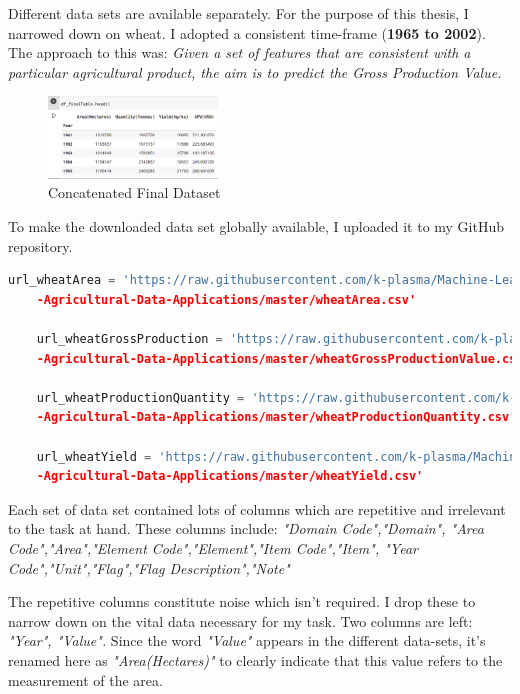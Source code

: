Different data sets are available separately. For the purpose of this thesis, I narrowed down on wheat. I adopted a consistent time-frame (\textbf{1965 to 2002}). The approach to this was: \textit{Given a set of features that are consistent with a particular agricultural product, the aim is to predict the Gross Production Value.}


\begin{figure}[h!]
	\centering
	\includegraphics[width=0.4\textwidth,height=\textheight,keepaspectratio]{fig/finaltable.png}
	\caption{Concatenated Final Dataset}
	\label{fig:CFD}
\end{figure}


To make the downloaded data set globally available, I uploaded it to my GitHub repository.\cite{adeyemo_2020}

\begin{lstlisting}[language=Python]
	url_wheatArea = 'https://raw.githubusercontent.com/k-plasma/Machine-Learning-Models-for
	-Agricultural-Data-Applications/master/wheatArea.csv'	
	
	url_wheatGrossProduction = 'https://raw.githubusercontent.com/k-plasma/Machine-Learning-Models-for
	-Agricultural-Data-Applications/master/wheatGrossProductionValue.csv'	
	
	url_wheatProductionQuantity = 'https://raw.githubusercontent.com/k-plasma/Machine-Learning-Models-for
	-Agricultural-Data-Applications/master/wheatProductionQuantity.csv'	
	
	url_wheatYield = 'https://raw.githubusercontent.com/k-plasma/Machine-Learning-Models-for
	-Agricultural-Data-Applications/master/wheatYield.csv'
\end{lstlisting}




Each set of data set contained lots of columns which are repetitive and irrelevant to the task at hand. These columns include: \textit{"Domain Code","Domain",
	"Area Code","Area","Element Code","Element","Item Code","Item",
	"Year Code","Unit","Flag","Flag Description","Note"}


The repetitive columns constitute noise which isn't required. I drop these to narrow down on the vital data necessary for my task. Two columns are left: \textit{"Year", "Value".} Since the word \textit{"Value"} appears in the different data-sets, it's renamed here as \textit{"Area(Hectares)"} to clearly indicate that this value refers to the measurement of the area.


